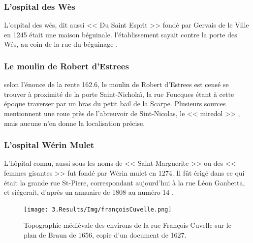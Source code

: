 \subsubsection{L'ospital des Wès}
L'ospital des wés, dit aussi << Du Saint Esprit >> fondé par Gervais de le Ville en 1245  était une maison béguinale. l'établissement sayait contre la porte des Wés, au coin de la rue du béguinage \parencite{brassart_notes_1842}.

\subsubsection{Le moulin de Robert d'Estrees}
selon l'énonce de la rente 162.6, le moulin de Robert d'Estrees est censé se trouver à proximité de la porte Saint-Nicholaï, la rue Foucques étant à cette époque traverser par un bras du petit bail de la Scarpe. Plusieurs sources mentionnent une roue près de  l'abreuvoir de Sint-Nicolas, le  << miredol >> \parencite{lohrmann_entre_1984,brassart_memoire_1862,colin_decouvrez_2001}, mais aucune n'en donne la localisation précise.

\subsubsection{L'ospital Wérin Mulet}
L'hôpital connu, aussi sous les noms de << Saint-Marguerite >> ou des << femmes gisantes >> fut fondé par Wérin mulet en 1274. Il fût érigé dans ce qui était la grande rue St-Piere, correspondant aujourd'hui à la rue Léon Ganbetta, et siégerait, d'après un annuaire  de 1808  au numéro 14 \parencite{brassart_notes_1842}.

\begin{figure}
    \centering
    \texttt{[image: 3.Results/Img/françoisCuvelle.png]}
    \caption{Topographie médiévale des environs de la rue François Cuvelle sur le plan de Braun de 1656, copie d’un document de 1627.}
    \label{fig:françoiscuvelle}
\end{figure}

